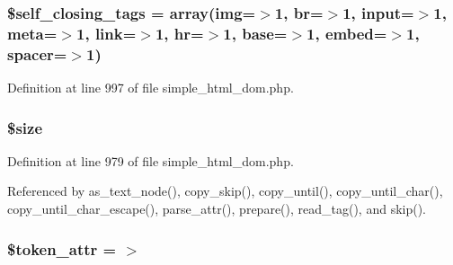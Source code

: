 \subsubsection[{\$self\+\_\+closing\+\_\+tags}]{\setlength{\rightskip}{0pt plus 5cm}\$self\+\_\+closing\+\_\+tags = array(\textquotesingle{}img\textquotesingle{}=$>$1, \textquotesingle{}br\textquotesingle{}=$>$1, \textquotesingle{}input\textquotesingle{}=$>$1, \textquotesingle{}meta\textquotesingle{}=$>$1, \textquotesingle{}link\textquotesingle{}=$>$1, \textquotesingle{}hr\textquotesingle{}=$>$1, \textquotesingle{}base\textquotesingle{}=$>$1, \textquotesingle{}embed\textquotesingle{}=$>$1, \textquotesingle{}spacer\textquotesingle{}=$>$1)\hspace{0.3cm}{\ttfamily [protected]}}\label{classsimple__html__dom_af36f0e679f54f7ee558dd5b96d4b8727}


Definition at line 997 of file simple\+\_\+html\+\_\+dom.\+php.

\hypertarget{classsimple__html__dom_af594986e4618a8d6a5d7566617f583c6}{}
\subsubsection[{\$size}]{\setlength{\rightskip}{0pt plus 5cm}\$size}\label{classsimple__html__dom_af594986e4618a8d6a5d7566617f583c6}


Definition at line 979 of file simple\+\_\+html\+\_\+dom.\+php.



Referenced by as\+\_\+text\+\_\+node(), copy\+\_\+skip(), copy\+\_\+until(), copy\+\_\+until\+\_\+char(), copy\+\_\+until\+\_\+char\+\_\+escape(), parse\+\_\+attr(), prepare(), read\+\_\+tag(), and skip().

\hypertarget{classsimple__html__dom_a0fb7a78d4e17bb7d156df4f5b79c4d30}{}
\subsubsection[{\$token\+\_\+attr}]{\setlength{\rightskip}{0pt plus 5cm}\$token\+\_\+attr = \textquotesingle{} $>$\textquotesingle{}\hspace{0.3cm}{\ttfamily [protected]}}\label{classsimple__html__dom_a0fb7a78d4e17bb7d156df4f5b79c4d30}


